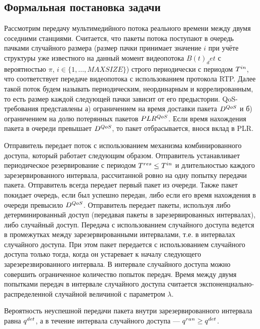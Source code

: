 \subsection{Формальная постановка задачи}
\label{sec:problem_statement}


Рассмотрим передачу мультимедийного потока реального времени между двумя соседними станциями. Считается, что пакеты потока поступают в очередь пачками случайного размера (размер пачки принимает значение $i$ при учёте структуры уже известного на данный момент видеопотока $B(t)_det$ с вероятностью $\pi$, $i \in \{1, \ldots, MAXSIZE\}$) строго периодически с периодом $T^{in}$, что соответствует передаче видеопотока с использованием протокола RTP. Далее такой поток будем называть периодическим, неординарным и коррелированным, то есть размер каждой следующей пачки зависит от его предыстории. QoS-требования представлены а) ограничением на время доставки пакета $D^{QoS}$ и б) ограничением на долю потерянных пакетов $PLR^{QoS}$. Если время нахождения пакета в очереди превышает $D^{QoS}$, то пакет отбрасывается, внося вклад в PLR.

Отправитель передает поток с использованием механизма комбинированного доступа, который работает следующим образом.
Отправитель устанавливает периодическое резервирование  с периодом $T^{res} \leq T^{in}$ и длительностью каждого зарезервированного интервала, рассчитанной ровно на одну попытку передачи пакета.
Отправитель всегда передает первый пакет из очереди.
Также пакет покидает очередь, если был успешно передан, либо если его время нахождения в очереди превысило $D^{QoS}$.
Отправитель передает пакеты, используя либо детерминированный доступ (передавая пакеты в зарезервированных интервалах), либо случайный доступ. 
Передача с использованием случайного доступа ведется в промежутках между зарезервированными интервалами, т.е. в интервалах случайного доступа.
При этом пакет передается с использованием случайного доступа только тогда, когда он устаревает к началу следующего зарезерезвированного интервала.
В интервале случайного доступа можно совершить ограниченное количество попыток передач.
Время между двумя попытками передач в интервале случайного доступа считается  экспоненциально-распределенной случайной величиной с параметром $\lambda$. 

Вероятность неуспешной передачи пакета внутри зарезервированного интервала равна $q^{det}$, а в течение интервала случайного доступа --- $q^{ran} \geq q^{det}$. 

